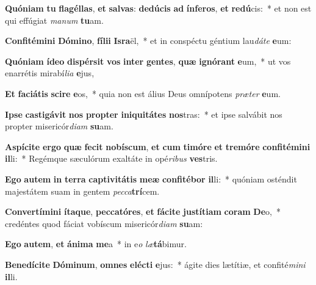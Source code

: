 \item \textbf{Quón}\textbf{i}\textbf{am} \textbf{tu} \textbf{fla}\textbf{gél}\textbf{las}, \textbf{et} \textbf{sal}\textbf{vas}: \textbf{de}\textbf{dú}\textbf{cis} \textbf{ad} \textbf{ín}\textbf{fe}\textbf{ros}, \textbf{et} \textbf{re}\textbf{dú}cis:~* et non est qui effúgiat \textit{ma}\textit{num} \textbf{tu}am.
\item \textbf{Con}\textbf{fi}\textbf{té}\textbf{mi}\textbf{ni} \textbf{Dó}\textbf{mi}\textbf{no}, \textbf{fí}\textbf{li}\textbf{i} \textbf{Is}\textbf{ra}ël,~* et in conspéctu géntium lau\textit{dá}\textit{te} \textbf{e}um:
\item \textbf{Quón}\textbf{i}\textbf{am} \textbf{íd}\textbf{e}\textbf{o} \textbf{di}\textbf{spér}\textbf{sit} \textbf{vos} \textbf{in}\textbf{ter} \textbf{gen}\textbf{tes}, \textbf{quæ} \textbf{i}\textbf{gnó}\textbf{rant} \textbf{e}um,~* ut vos enarrétis mirabí\textit{li}\textit{a} \textbf{e}jus,
\item \textbf{Et} \textbf{fa}\textbf{ci}\textbf{á}\textbf{tis} \textbf{sci}\textbf{re} \textbf{e}os,~* quia non est álius Deus omnípotens \textit{præ}\textit{ter} \textbf{e}um.
\item \textbf{Ip}\textbf{se} \textbf{cas}\textbf{ti}\textbf{gá}\textbf{vit} \textbf{nos} \textbf{prop}\textbf{ter} \textbf{in}\textbf{i}\textbf{qui}\textbf{tá}\textbf{tes} \textbf{nos}tras:~* et ipse salvábit nos propter misericór\textit{di}\textit{am} \textbf{su}am.
\item \textbf{A}\textbf{spí}\textbf{ci}\textbf{te} \textbf{er}\textbf{go} \textbf{quæ} \textbf{fe}\textbf{cit} \textbf{no}\textbf{bís}\textbf{cum}, \textbf{et} \textbf{cum} \textbf{ti}\textbf{mó}\textbf{re} \textbf{et} \textbf{tre}\textbf{mó}\textbf{re} \textbf{con}\textbf{fi}\textbf{té}\textbf{mi}\textbf{ni} \textbf{il}li:~* Regémque sæculórum exaltáte in opé\textit{ri}\textit{bus} \textbf{ves}tris.
\item \textbf{E}\textbf{go} \textbf{au}\textbf{tem} \textbf{in} \textbf{ter}\textbf{ra} \textbf{cap}\textbf{ti}\textbf{vi}\textbf{tá}\textbf{tis} \textbf{me}\textbf{æ} \textbf{con}\textbf{fi}\textbf{té}\textbf{bor} \textbf{il}li:~* quóniam osténdit majestátem suam in gentem \textit{pec}\textit{ca}\textbf{trí}cem.
\item \textbf{Con}\textbf{ver}\textbf{tí}\textbf{mi}\textbf{ni} \textbf{í}\textbf{ta}\textbf{que}, \textbf{pec}\textbf{ca}\textbf{tó}\textbf{res}, \textbf{et} \textbf{fá}\textbf{ci}\textbf{te} \textbf{jus}\textbf{tí}\textbf{ti}\textbf{am} \textbf{co}\textbf{ram} \textbf{De}o,~* credéntes quod fáciat vobíscum misericór\textit{di}\textit{am} \textbf{su}am:
\item \textbf{E}\textbf{go} \textbf{au}\textbf{tem}, \textbf{et} \textbf{á}\textbf{ni}\textbf{ma} \textbf{me}a~* in e\textit{o} \textit{læ}\textbf{tá}bimur.
\item \textbf{Be}\textbf{ne}\textbf{dí}\textbf{ci}\textbf{te} \textbf{Dó}\textbf{mi}\textbf{num}, \textbf{om}\textbf{nes} \textbf{e}\textbf{léc}\textbf{ti} \textbf{e}jus:~* ágite dies lætítiæ, et confité\textit{mi}\textit{ni} \textbf{il}li.
